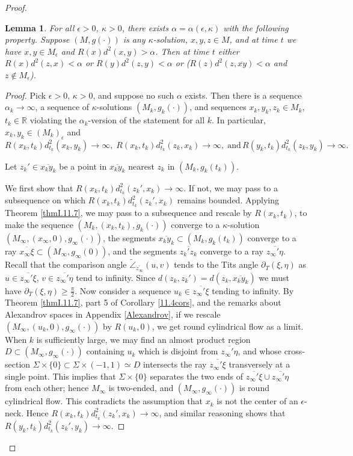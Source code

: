 \documentclass[12pt]{amsart}
\newcommand{\al}{\alpha}
\newcommand{\R}{{\mathbb R}}
\newcommand{\cangle}{\widetilde{\angle}}
\newcommand{\eps}{\epsilon}
\newcommand{\ol}{\overline}
\newcommand{\ra}{\rightarrow}
\newcommand{\Si}{\Sigma}
\newcommand{\tangle}{\partial_T}
\numberwithin{equation}{section}
\theoremstyle{plain}
\newtheorem{lemma}[equation]{Lemma}
\theoremstyle{definition}
\theoremstyle{remark}
\begin{document}
\begin{proof}
\begin{lemma}
\label{annoy}
For all $\eps>0$, $\kappa>0$,  there exists 
$\al=\al(\eps,\kappa)$  with the following 
property.  Suppose $(M,g(\cdot))$ is any 
$\kappa$-solution, $x,y,z\in M$, and 
at time $t$ we have $x, y \in M_\epsilon$
and $R(x)d^2(x,y)>\al$.  Then at time $t$ either 
$R(x)d^2(z,x)<\al$ or $R(y)d^2(z,y)<\al$ or ($R(z)d^2(z,\ol{xy})<\al$ and 
$z \notin M_\epsilon$).
\end{lemma}
\begin{proof}
Pick $\eps>0,\,\kappa>0$, and suppose no such $\al$ exists.  Then
there is a sequence $\al_k\ra\infty$, a  
sequence of $\kappa$-solutions $(M_k,g_k(\cdot))$,
and sequences $x_k,y_k,z_k\in M_k$, $t_k\in \R$ violating the $\al_k$-version
of the statement
for all $k$.  In particular, $x_k, y_k \in (M_k)_\epsilon$ and
\begin{equation}
R(x_k,t_k)d^2_{t_k}(x_k,y_k)\ra\infty,\; 
R(x_k,t_k)d^2_{t_k}(z_k,x_k)\ra\infty,\;
\mbox{and}\,R(y_k,t_k)d^2_{t_k}(z_k,y_k)\ra\infty.
\end{equation}

 Let $z_k'\in\ol{x_ky_k}$ be a point in $\ol{x_ky_k}$ 
nearest $z_k$ in $(M_k,g_k(t_k))$.



We first show that $R(x_k,t_k)d_{t_k}^2(z_k',x_k)\ra\infty$.
If not, we may pass to a subsequence on which $R(x_k,t_k)d_{t_k}^2(z_k',x_k)$
remains bounded.   Applying Theorem \ref{thmI.11.7}, we may
pass to a subsequence and 
rescale by $R(x_k,t_k)$,  
to make the sequence $(M_k,(x_k,t_k),g_k(\cdot))$
converge to a $\kappa$-solution $(M_\infty,(x_\infty,0),g_\infty(\cdot))$,
the segments $\ol{x_ky_k}\subset (M_k,g_k(t_k))$
converge to a ray $\ol{x_\infty\xi}\subset (M_\infty,g_\infty(0))$,
and the segments $\ol{z_k'z_k}$ converge to
a ray $\ol{z_\infty'\eta}$.  Recall that the comparison angle
$\cangle_{z^\prime_\infty}(u,v)$ tends to the Tits angle
$\tangle(\xi,\eta)$ as $u\in\ol{z_\infty'\xi}$, $v\in \ol{z_\infty'\eta}$
tend to infinity.  Since $d(z_k,z_k')=d(z_k,\ol{x_ky_k})$ we must
have $\tangle(\xi,\eta)\geq\frac{\pi}{2}$.  Now consider a sequence
$u_k\in \ol{z_\infty'\xi}$ tending to infinity.  By 
Theorem \ref{thmI.11.7}, part 5 of Corollary \ref{11.4cors},
and the remarks about Alexandrov spaces in Appendix \ref{Alexandrov},
if we rescale $(M_\infty,(u_k,0),g_\infty(\cdot))$ by $R(u_k,0)$,
we get round cylindrical flow as a limit.   When $k$ is sufficiently
large,
we may find an almost product region $D\subset (M_\infty,g_\infty(\cdot))$
containing $u_k$ which is disjoint from $\ol{z_\infty'\eta}$,
and whose cross-section $\Si\times\{0\}\subset\Si\times (-1,1)\simeq D$
intersects the ray $\ol{z_\infty'\xi}$ transversely at a single point.
This implies that $\Si\times \{0\}$ separates the two ends
of $\ol{z_\infty'\xi}\cup\ol{z_\infty'\eta}$ from each other; hence
$M_\infty$ is two-ended, and $(M_\infty,g_\infty(\cdot))$ is round
cylindrical flow.   This contradicts the assumption that
$x_k$ is not the center of
an $\eps$-neck.  Hence $R(x_k,t_k)d_{t_k}^2(z_k',x_k)\ra\infty$,
and similar reasoning shows that $R(y_k,t_k)d_{t_k}^2(z_k',y_k)\ra\infty$.


\end{proof}
\end{proof}
\end{document}
